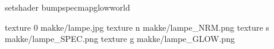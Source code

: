 setshader bumpspecmapglowworld

texture 0 makke/lampe.jpg
texture n makke/lampe_NRM.png
texture s makke/lampe_SPEC.png
texture g makke/lampe_GLOW.png
